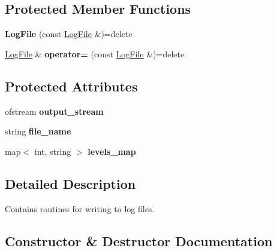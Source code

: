 \subsection*{Protected Member Functions}
\begin{DoxyCompactItemize}
\item 
{\bfseries Log\+File} (const \hyperlink{class_log_file}{Log\+File} \&)=delete\hypertarget{class_log_file_ad18ff4b82ec0b081cbfd9556a48194fe}{}\label{class_log_file_ad18ff4b82ec0b081cbfd9556a48194fe}

\item 
\hyperlink{class_log_file}{Log\+File} \& {\bfseries operator=} (const \hyperlink{class_log_file}{Log\+File} \&)=delete\hypertarget{class_log_file_a3556b56361a4f9f1cc83e9c3967096ab}{}\label{class_log_file_a3556b56361a4f9f1cc83e9c3967096ab}

\end{DoxyCompactItemize}
\subsection*{Protected Attributes}
\begin{DoxyCompactItemize}
\item 
ofstream {\bfseries output\+\_\+stream}\hypertarget{class_log_file_aae3e784ed5a2414b57d46940a2995c82}{}\label{class_log_file_aae3e784ed5a2414b57d46940a2995c82}

\item 
string {\bfseries file\+\_\+name}\hypertarget{class_log_file_a0fcd1e0a15e6c08f147b39dbea2b253c}{}\label{class_log_file_a0fcd1e0a15e6c08f147b39dbea2b253c}

\item 
map$<$ int, string $>$ {\bfseries levels\+\_\+map}\hypertarget{class_log_file_a75e3b5022358adcff29923c0e9116ff4}{}\label{class_log_file_a75e3b5022358adcff29923c0e9116ff4}

\end{DoxyCompactItemize}


\subsection{Detailed Description}
Contains routines for writing to log files. 

\subsection{Constructor \& Destructor Documentation}
